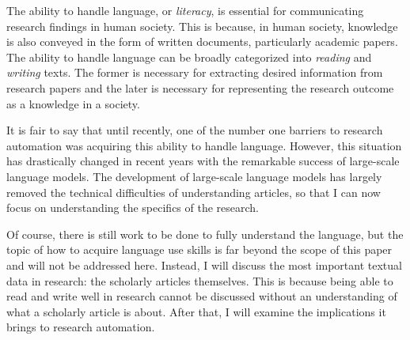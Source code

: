 \documentclass{book}
\begin{document}
The ability to handle language, or \textit{literacy}, is essential for communicating research findings in human society. This is because, in human society, knowledge is also conveyed in the form of written documents, particularly academic papers. The ability to handle language can be broadly categorized into \textit{reading} and \textit{writing} texts. The former is necessary for extracting desired information from research papers and the later is necessary for representing the research outcome as a knowledge in a society.

It is fair to say that until recently, one of the number one barriers to research automation was acquiring this ability to handle language. However, this situation has drastically changed in recent years with the remarkable success of large-scale language models. The development of large-scale language models has largely removed the technical difficulties of understanding articles, so that I can now focus on understanding the specifics of the research.

Of course, there is still work to be done to fully understand the language, but the topic of how to acquire language use skills is far beyond the scope of this paper and will not be addressed here. Instead, I will discuss the most important textual data in research: the scholarly articles themselves. This is because being able to read and write well in research cannot be discussed without an understanding of what a scholarly article is about. After that, I will examine the implications it brings to research automation.



\end{document}
